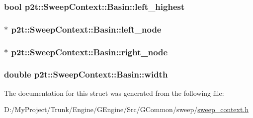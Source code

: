\subsubsection[{left\+\_\+highest}]{\setlength{\rightskip}{0pt plus 5cm}bool p2t\+::\+Sweep\+Context\+::\+Basin\+::left\+\_\+highest}\label{structp2t_1_1_sweep_context_1_1_basin_a91a2cdcccb03f88b66ce7e86e3d9820f}
\hypertarget{structp2t_1_1_sweep_context_1_1_basin_ac547533c638f5c459b036087b044cae6}{}
\subsubsection[{left\+\_\+node}]{$\ast$ p2t\+::\+Sweep\+Context\+::\+Basin\+::left\+\_\+node}\label{structp2t_1_1_sweep_context_1_1_basin_ac547533c638f5c459b036087b044cae6}
\hypertarget{structp2t_1_1_sweep_context_1_1_basin_a87f10edada0bf4a6c29cfb369c39bbb2}{}
\subsubsection[{right\+\_\+node}]{$\ast$ p2t\+::\+Sweep\+Context\+::\+Basin\+::right\+\_\+node}\label{structp2t_1_1_sweep_context_1_1_basin_a87f10edada0bf4a6c29cfb369c39bbb2}
\hypertarget{structp2t_1_1_sweep_context_1_1_basin_af3a83853a71d90a5ad0e2db66f44911c}{}
\subsubsection[{width}]{\setlength{\rightskip}{0pt plus 5cm}double p2t\+::\+Sweep\+Context\+::\+Basin\+::width}\label{structp2t_1_1_sweep_context_1_1_basin_af3a83853a71d90a5ad0e2db66f44911c}


The documentation for this struct was generated from the following file\+:\begin{DoxyCompactItemize}
\item 
D\+:/\+My\+Project/\+Trunk/\+Engine/\+G\+Engine/\+Src/\+G\+Common/sweep/\hyperlink{sweep__context_8h}{sweep\+\_\+context.\+h}\end{DoxyCompactItemize}
